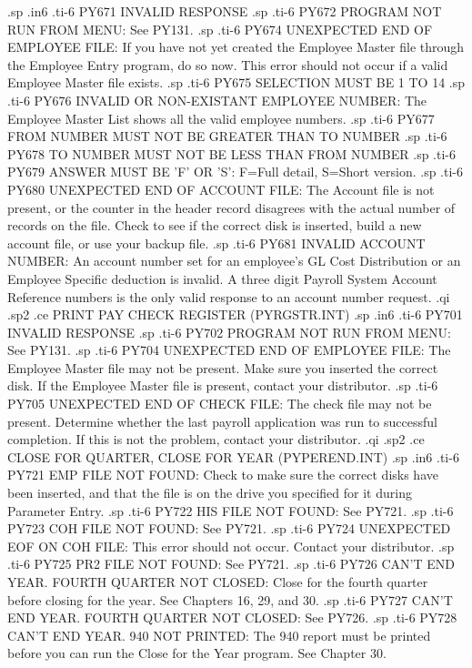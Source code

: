 .sp
.in6
.ti-6
PY671 INVALID RESPONSE
.sp
.ti-6
PY672 PROGRAM NOT RUN FROM MENU: See PY131.
.sp
.ti-6
PY674 UNEXPECTED END OF EMPLOYEE FILE: If you have not yet created the
Employee Master file through the Employee Entry program, do so now.
This error should not occur if a valid Employee Master file exists.
.sp
.ti-6
PY675 SELECTION MUST BE 1 TO 14
.sp
.ti-6
PY676 INVALID OR NON-EXISTANT EMPLOYEE NUMBER: The Employee Master List
shows all the valid employee numbers.
.sp
.ti-6
PY677 FROM NUMBER MUST NOT BE GREATER THAN TO NUMBER
.sp
.ti-6
PY678 TO NUMBER MUST NOT BE LESS THAN FROM NUMBER
.sp
.ti-6
PY679 ANSWER MUST BE 'F' OR 'S': F=Full detail, S=Short version.
.sp
.ti-6
PY680 UNEXPECTED END OF ACCOUNT FILE: The Account file is not present, or
the counter in the header record disagrees with the actual number of
records on the file.  Check to see if the correct disk is inserted,
build a new account file, or use your backup file.
.sp
.ti-6
PY681 INVALID ACCOUNT NUMBER: An account number set for an employee's
GL Cost Distribution or an Employee Specific deduction is invalid.
A three digit Payroll System Account Reference numbers is the only valid
response to an account number request.
.qi
.sp2
.ce
PRINT PAY CHECK REGISTER (PYRGSTR.INT)
.sp
.in6
.ti-6
PY701 INVALID RESPONSE
.sp
.ti-6
PY702 PROGRAM NOT RUN FROM MENU: See PY131.
.sp
.ti-6
PY704 UNEXPECTED END OF EMPLOYEE FILE: The Employee Master file may not be
present.  Make sure you inserted the correct disk.  If the Employee Master
file is present, contact your distributor.
.sp
.ti-6
PY705 UNEXPECTED END OF CHECK FILE: The check file may not be present.
Determine whether the last payroll application was run to successful
completion.  If this is not the problem, contact your distributor.
.qi
.sp2
.ce
CLOSE FOR QUARTER, CLOSE FOR YEAR (PYPEREND.INT)
.sp
.in6
.ti-6
PY721 EMP FILE NOT FOUND: Check to make sure the correct disks have
been inserted, and that the file is on the drive you specified for it
during Parameter Entry.
.sp
.ti-6
PY722 HIS FILE NOT FOUND: See PY721.
.sp
.ti-6
PY723 COH FILE NOT FOUND: See PY721.
.sp
.ti-6
PY724 UNEXPECTED EOF ON COH FILE: This error should not occur. Contact
your distributor.
.sp
.ti-6
PY725 PR2 FILE NOT FOUND: See PY721.
.sp
.ti-6
PY726 CAN'T END YEAR.  FOURTH QUARTER NOT CLOSED: Close for the fourth
quarter before closing for the year.  See Chapters 16, 29, and 30.
.sp
.ti-6
PY727 CAN'T END YEAR.  FOURTH QUARTER NOT CLOSED: See PY726.
.sp
.ti-6
PY728 CAN'T END YEAR.  940 NOT PRINTED: The 940 report must be printed
before you can run the Close for the Year program.  See Chapter 30.
